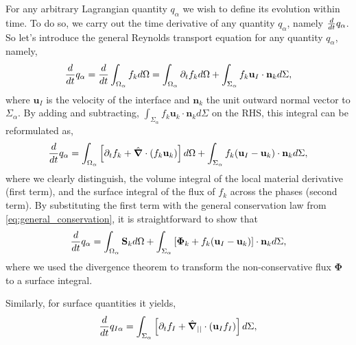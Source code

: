 For any arbitrary Lagrangian quantity $q_\alpha$ we wish to define its evolution within time.
To do so, we carry out the time derivative of any quantity $q_\alpha$, namely $\frac{d}{d t} q_\alpha$.
So let's introduce the general Reynolds transport equation for any quantity $q_\alpha$, namely,
\begin{equation*}
    \frac{d}{d t}  q_\alpha
    = \frac{d}{d t} \int_{\Omega_\alpha} f_k d\Omega
    = \int_{\Omega_\alpha} \partial_t f_kd\Omega
    + \int_{\Sigma_\alpha} f_k \textbf{u}_I \cdot \textbf{n}_k d\Sigma,
\end{equation*}
where $\textbf{u}_I$ is the velocity of the interface and $\textbf{n}_k$ the unit outward normal vector to $\Sigma_\alpha$.
By adding and subtracting, $\int_{\Sigma_\alpha} f_k \textbf{u}_k\cdot \textbf{n}_k d\Sigma$ on the RHS,  this integral can be reformulated as,
\begin{equation}
    \frac{d}{d t}  q_\alpha
    = \int_{\Omega_\alpha}\left[ \partial_t f_k + \hat{\bm{\nabla}} \cdot\left(f_k\textbf{u}_k\right) \right]d\Omega\\
    + \int_{\Sigma_\alpha} f_k (\textbf{u}_I-\textbf{u}_k)\cdot \textbf{n}_k d\Sigma,
\end{equation}
where we clearly distinguish, the volume integral of the local material derivative (first term), and the surface integral of the flux of $f_k$ across the phases (second term).
By substituting the first term with the general conservation law from \ref{eq:general_conservation}, it is straightforward to show that
\begin{equation}
    \frac{d}{d t}  q_\alpha
    = \int_{\Omega_\alpha} \textbf{S}_k d\Omega
    + \int_{\Sigma_\alpha} \left[\bm{\Phi}_k + f_k (\textbf{u}_I-\textbf{u}_k) \right] \cdot \textbf{n}_k d\Sigma,
    \label{eq:dt_q_alpha}
\end{equation}
where we used the divergence theorem to transform the non-conservative flux $\bm{\Phi}$ to a surface integral.

Similarly, for surface quantities it yields, 
\begin{equation}
    \frac{d}{d t}  q_{I\alpha}
    = \int_{\Sigma_\alpha} \left[
        \partial_t f_I
        +   \hat{\bm{\nabla}}_{||} \cdot (\textbf{u}_If_I)
    \right]d\Sigma,
\end{equation}

